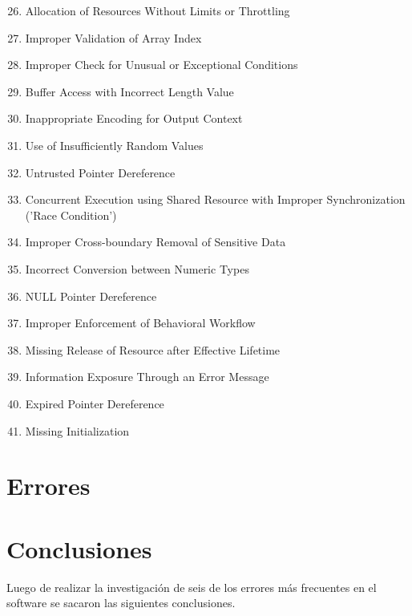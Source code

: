 \documentclass[a4paper,10pt]{article}
\begin{document}
\begin{enumerate}
 \setcounter{enumi}{25}
 \item Allocation of Resources Without Limits or Throttling
 \item Improper Validation of Array Index
 \item Improper Check for Unusual or Exceptional Conditions
 \item Buffer Access with Incorrect Length Value
 \item Inappropriate Encoding for Output Context
 \item Use of Insufficiently Random Values
 \item Untrusted Pointer Dereference
 \item Concurrent Execution using Shared Resource with Improper Synchronization ('Race Condition')
 \item Improper Cross-boundary Removal of Sensitive Data
 \item Incorrect Conversion between Numeric Types
 \item NULL Pointer Dereference
 \item Improper Enforcement of Behavioral Workflow
 \item Missing Release of Resource after Effective Lifetime
 \item Information Exposure Through an Error Message
 \item Expired Pointer Dereference
 \item Missing Initialization
\end{enumerate}

\clearpage
\section{Errores}











\clearpage
\section{Conclusiones}

Luego de realizar la investigación de seis de los errores más frecuentes en el software se sacaron las siguientes
conclusiones.
\end{document}
